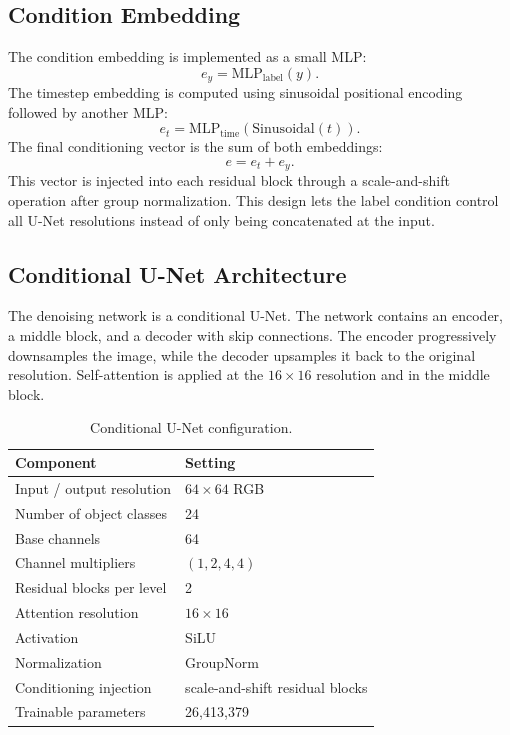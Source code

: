 \documentclass[12pt,a4paper]{article}
\makeatletter
\newcommand{\NeedReportSpace}[1]{%
    \par
    \begingroup
    \dimen@=#1\relax
    \ifdim\dimexpr\pagegoal-\pagetotal\relax<\dimen@
        \pagebreak
    \fi
    \endgroup
}
\makeatother
\begin{document}
\subsection{Condition Embedding}

The condition embedding is implemented as a small MLP:
\[
    e_y = \mathrm{MLP}_{\mathrm{label}}(y).
\]
The timestep embedding is computed using sinusoidal positional encoding
followed by another MLP:
\[
    e_t = \mathrm{MLP}_{\mathrm{time}}(\mathrm{Sinusoidal}(t)).
\]
The final conditioning vector is the sum of both embeddings:
\[
    e = e_t + e_y.
\]
This vector is injected into each residual block through a scale-and-shift
operation after group normalization.  This design lets the label condition
control all U-Net resolutions instead of only being concatenated at the input.

\subsection{Conditional U-Net Architecture}

The denoising network is a conditional U-Net.  The network contains an encoder,
a middle block, and a decoder with skip connections.  The encoder progressively
downsamples the image, while the decoder upsamples it back to the original
resolution.  Self-attention is applied at the $16 \times 16$ resolution and in
the middle block.

\NeedReportSpace{14\baselineskip}
\begin{table}[H]
    \centering
    \caption{Conditional U-Net configuration.}
    \label{tab:unet_config}
    \renewcommand{\arraystretch}{1.2}
    \begin{tabular}{ll}
    \toprule
    \textbf{Component} & \textbf{Setting} \\
    \midrule
    Input / output resolution & $64 \times 64$ RGB \\
    Number of object classes & 24 \\
    Base channels & 64 \\
    Channel multipliers & $(1,2,4,4)$ \\
    Residual blocks per level & 2 \\
    Attention resolution & $16 \times 16$ \\
    Activation & SiLU \\
    Normalization & GroupNorm \\
    Conditioning injection & scale-and-shift residual blocks \\
    Trainable parameters & 26,413,379 \\
    \bottomrule
    \end{tabular}
\end{table}
\end{document}
